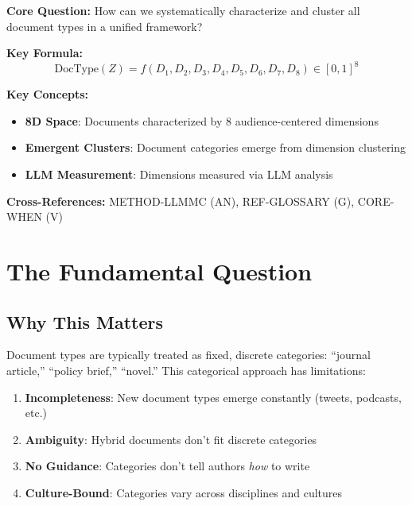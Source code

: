 \begin{tcolorbox}[colback=blue!5!white, colframe=blue!75!black,
    title=Quick Reference: 8D Document Type Framework]

\textbf{Core Question:} How can we systematically characterize and cluster
all document types in a unified framework?

\textbf{Key Formula:}
\begin{equation}
\text{DocType}(Z) = f(D_1, D_2, D_3, D_4, D_5, D_6, D_7, D_8) \in [0,1]^8
\end{equation}

\textbf{Key Concepts:}
\begin{itemize}[nosep]
\item \textbf{8D Space}: Documents characterized by 8 audience-centered dimensions
\item \textbf{Emergent Clusters}: Document categories emerge from dimension clustering
\item \textbf{LLM Measurement}: Dimensions measured via LLM analysis
\end{itemize}

\textbf{Cross-References:} METHOD-LLMMC (AN), REF-GLOSSARY (G), CORE-WHEN (V)
\end{tcolorbox}


\section{The Fundamental Question}
\label{sec:doctype-fundamental}

\subsection{Why This Matters}

Document types are typically treated as fixed, discrete categories: ``journal article,''
``policy brief,'' ``novel.'' This categorical approach has limitations:

\begin{enumerate}
\item \textbf{Incompleteness}: New document types emerge constantly (tweets, podcasts, etc.)
\item \textbf{Ambiguity}: Hybrid documents don't fit discrete categories
\item \textbf{No Guidance}: Categories don't tell authors \textit{how} to write
\item \textbf{Culture-Bound}: Categories vary across disciplines and cultures
\end{enumerate}

